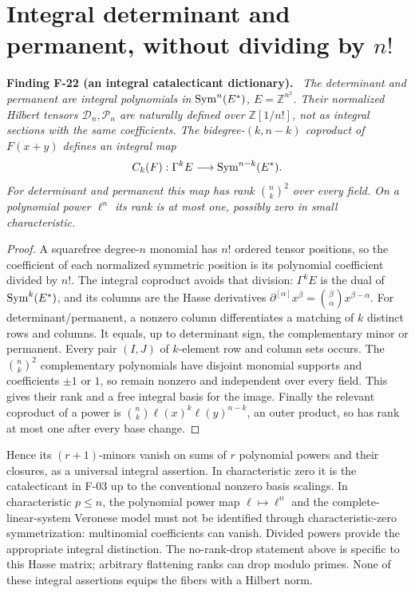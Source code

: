 \documentclass[11pt]{article}
\newcommand{\Z}{\mathbb Z}\newcommand{\Q}{\mathbb Q}
\newenvironment{finding}[2]{\par\medskip\noindent\textbf{Finding #1 (#2).}\ \itshape}{\par\medskip}
\begin{document}
\section{Integral determinant and permanent, without dividing by \texorpdfstring{$n!$}{n!}}
\begin{finding}{F-22}{an integral catalecticant dictionary}
The determinant and permanent are integral polynomials in
$\operatorname{Sym}^n(E^*)$, $E=\Z^{n^2}$. Their normalized Hilbert tensors
$\mathcal D_n,\mathcal P_n$ are naturally defined over
$\Z[1/n!]$, not as integral sections with the same coefficients.
The bidegree-$(k,n-k)$ coproduct of $F(x+y)$ defines an integral map
\[
 C_k(F):\Gamma^k E\longrightarrow\operatorname{Sym}^{n-k}(E^*).
\]
For determinant and permanent this map has rank $\binom nk^2$
over every field. On a polynomial power $\ell^n$ its rank is
at most one, possibly zero in small characteristic.
\end{finding}
\begin{proof}
A squarefree degree-$n$ monomial has $n!$ ordered tensor
positions, so the coefficient of each normalized symmetric
position is its polynomial coefficient divided by $n!$.
The integral coproduct avoids that division:
$\Gamma^kE$ is the dual of $\operatorname{Sym}^k(E^*)$, and its columns
are the Hasse derivatives
$\partial^{[\alpha]}x^\beta=\binom\beta\alpha x^{\beta-\alpha}$.
For determinant/permanent, a nonzero column differentiates a
matching of $k$ distinct rows and columns. It equals, up to
determinant sign, the complementary minor or permanent.
Every pair $(I,J)$ of $k$-element row and column sets occurs.
The $\binom nk^2$ complementary polynomials have disjoint
monomial supports and coefficients $\pm1$ or $1$, so remain
nonzero and independent over every field. This gives their
rank and a free integral basis for the image.
Finally the relevant coproduct of a power is
$\binom nk\ell(x)^k\ell(y)^{n-k}$, an outer product,
so has rank at most one after every base change.
\end{proof}
Hence its $(r+1)$-minors vanish on sums of $r$ polynomial
powers and their closures, as a universal integral assertion.
In characteristic zero it is the catalecticant in F-03 up to
the conventional nonzero basis scalings.
In characteristic $p\leq n$, the polynomial power map
$\ell\mapsto\ell^n$ and the complete-linear-system Veronese
model must not be identified through characteristic-zero
symmetrization: multinomial coefficients can vanish.
Divided powers provide the appropriate integral distinction.
The no-rank-drop statement above is specific to this Hasse
matrix; arbitrary flattening ranks can drop modulo primes.
None of these integral assertions equips the fibers with a
Hilbert norm.
\end{document}
